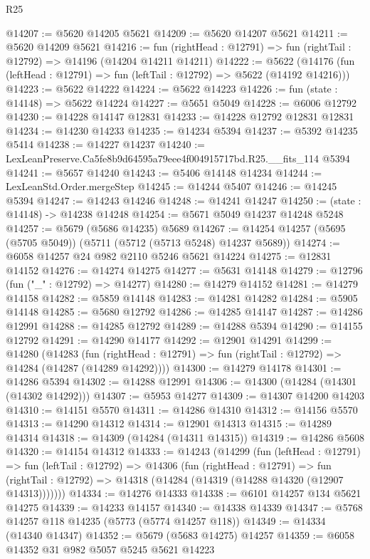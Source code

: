 \begin{lexlean}{R25}
\begin{coremodule}
@14207 := @5620 @14205 @5621
@14209 := @5620 @14207 @5621
@14211 := @5620 @14209 @5621
@14216 := fun (rightHead : @12791) => fun (rightTail : @12792) => @14196 (@14204 @14211 @14211)
@14222 := @5622
    (@14176 (fun (leftHead : @12791) => fun (leftTail : @12792) => @5622 (@14192 @14216)))
@14223 := @5622 @14222
@14224 := @5622 @14223
@14226 := fun (state : @14148) => @5622 @14224
@14227 := @5651 @5049
@14228 := @6006 @12792
@14230 := @14228 @14147 @12831
@14233 := @14228 @12792 @12831 @12831
@14234 := @14230 @14233
@14235 := @14234 @5394
@14237 := @5392 @14235 @5414
@14238 := @14227 @14237
@14240 := LexLeanPreserve.Ca5fe8b9d64595a79eee4f004915717bd.R25.__fits_114 @5394
@14241 := @5657 @14240
@14243 := @5406 @14148 @14234
@14244 := LexLeanStd.Order.mergeStep
@14245 := @14244 @5407
@14246 := @14245 @5394
@14247 := @14243 @14246
@14248 := @14241 @14247
@14250 := (state : @14148) -> @14238 @14248
@14254 := @5671 @5049 @14237 @14248 @5248
@14257 := @5679 (@5686 @14235) @5689
@14267 := @14254 @14257 (@5695 (@5705 @5049)) (@5711 (@5712 (@5713 @5248) @14237 @5689))
@14274 := @6058 @14257 @24 @982 @2110 @5246 @5621 @14224
@14275 := @12831 @14152
@14276 := @14274 @14275
@14277 := @5631 @14148
@14279 := @12796 (fun ("_" : @12792) => @14277)
@14280 := @14279 @14152
@14281 := @14279 @14158
@14282 := @5859 @14148
@14283 := @14281 @14282
@14284 := @5905 @14148
@14285 := @5680 @12792
@14286 := @14285 @14147
@14287 := @14286 @12991
@14288 := @14285 @12792
@14289 := @14288 @5394
@14290 := @14155 @12792
@14291 := @14290 @14177
@14292 := @12901 @14291
@14299 := @14280
    (@14283
      (fun (rightHead : @12791) => fun (rightTail : @12792) => @14284 (@14287 (@14289 @14292))))
@14300 := @14279 @14178
@14301 := @14286 @5394
@14302 := @14288 @12991
@14306 := @14300 (@14284 (@14301 (@14302 @14292)))
@14307 := @5953 @14277
@14309 := @14307 @14200 @14203
@14310 := @14151 @5570
@14311 := @14286 @14310
@14312 := @14156 @5570
@14313 := @14290 @14312
@14314 := @12901 @14313
@14315 := @14289 @14314
@14318 := @14309 (@14284 (@14311 @14315))
@14319 := @14286 @5608
@14320 := @14154 @14312
@14333 := @14243
    (@14299
      (fun (leftHead : @12791) =>
      fun (leftTail : @12792) =>
      @14306
        (fun (rightHead : @12791) =>
        fun (rightTail : @12792) => @14318 (@14284 (@14319 (@14288 @14320 (@12907 @14313)))))))
@14334 := @14276 @14333
@14338 := @6101 @14257 @134 @5621 @14275
@14339 := @14233 @14157
@14340 := @14338 @14339
@14347 := @5768 @14257 @118 @14235 (@5773 (@5774 @14257 @118))
@14349 := @14334 (@14340 @14347)
@14352 := @5679 (@5683 @14275) @14257
@14359 := @6058 @14352 @31 @982 @5057 @5245 @5621 @14223

\end{coremodule}
\end{lexlean}
